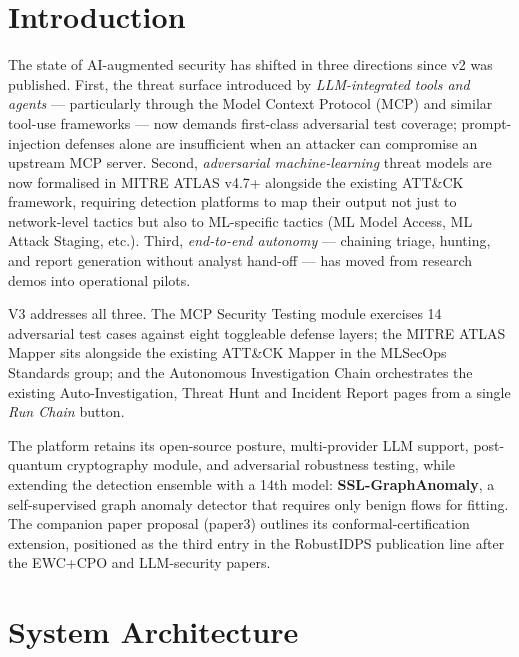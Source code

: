 \documentclass[11pt,a4paper]{article}
\begin{document}
\section{Introduction}
\label{sec:introduction}

The state of AI-augmented security has shifted in three directions
since v2 was published.  First, the threat surface introduced by
\emph{LLM-integrated tools and agents} --- particularly through the
Model Context Protocol (MCP) and similar tool-use frameworks --- now
demands first-class adversarial test coverage; prompt-injection
defenses alone are insufficient when an attacker can compromise an
upstream MCP server.  Second, \emph{adversarial machine-learning}
threat models are now formalised in MITRE ATLAS v4.7+ alongside the
existing ATT\&CK framework, requiring detection platforms to map their
output not just to network-level tactics but also to ML-specific
tactics (ML Model Access, ML Attack Staging, etc.).  Third,
\emph{end-to-end autonomy} --- chaining triage, hunting, and report
generation without analyst hand-off --- has moved from research demos
into operational pilots.

V3 addresses all three.  The MCP Security Testing module exercises
14 adversarial test cases against eight toggleable defense layers; the
MITRE ATLAS Mapper sits alongside the existing ATT\&CK Mapper in the
MLSecOps Standards group; and the Autonomous Investigation Chain
orchestrates the existing Auto-Investigation, Threat Hunt and Incident
Report pages from a single \emph{Run Chain} button.

The platform retains its open-source posture, multi-provider LLM
support, post-quantum cryptography module, and adversarial robustness
testing, while extending the detection ensemble with a 14th model:
\textbf{SSL-GraphAnomaly}, a self-supervised graph anomaly detector
that requires only benign flows for fitting.  The companion paper
proposal (paper3) outlines its conformal-certification extension,
positioned as the third entry in the RobustIDPS publication line
after the EWC+CPO and LLM-security papers.

\section{System Architecture}
\label{sec:architecture}
\end{document}
